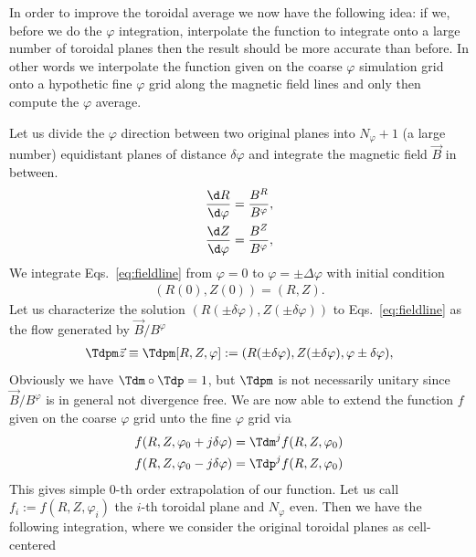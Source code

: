 In order to improve the toroidal average we now have the following idea:
if we, before we do the $\varphi$ integration,
interpolate the function to integrate onto a large number of toroidal
planes then the result should
be more accurate than before.
In other words we interpolate the function given on the coarse $\varphi$ simulation grid
onto a hypothetic fine $\varphi$ grid along the magnetic field lines
and only then compute the $\varphi$ average.

Let us divide the $\varphi$ direction between two original planes into $N_\varphi+1$ (a large number) equidistant planes
of distance $\delta \varphi$ and integrate the magnetic field $\vec B$ in between.
\begin{subequations}
\begin{align}
    \frac{\d R}{\d\varphi}&= \frac{B^R}{B^\varphi},\\ %
    \frac{\d Z}{\d\varphi}&=\frac{B^Z}{B^\varphi},\\%
\end{align}
\label{eq:fieldline}
\end{subequations}
We integrate Eqs.~\eqref{eq:fieldline} from $\varphi=0$ to $\varphi=\pm \Delta \varphi$
with initial condition
\begin{align}
    (R(0), Z(0) ) = (R, Z).
    \label{}
\end{align}
Let us characterize the solution $(R(\pm \delta \varphi), Z(\pm \delta \varphi))$ to Eqs.~\eqref{eq:fieldline} as the flow generated by $\vec B/B^\varphi$
\begin{align}
    \Tdpm\vec z \equiv \Tdpm[R, Z, \varphi]:= ( R(\pm \delta\varphi), Z( \pm \delta\varphi), \varphi\pm\delta \varphi),
    \label{}
\end{align}
Obviously we have $\Tdm\circ\Tdp = 1$, but $\Tdpm$ is not necessarily unitary since $\vec B/B^\varphi$ is in general
not divergence free.
We are now able to extend the function $f$ given on the coarse $\varphi$ grid unto the fine $\varphi$ grid via
\begin{align}
    f(R,Z,\varphi_0+j\delta\varphi) = {\Tdm}^j f(R,Z,\varphi_0)\\
    f(R,Z,\varphi_0-j\delta \varphi) = {\Tdp}^j f(R,Z,\varphi_0)
\end{align}
This gives simple 0-th order extrapolation of our function.
Let us call $f_i := f(R,Z,\varphi_i)$ the $i$-th toroidal plane and $N_\varphi$ even. Then
we have the following integration, where we consider the original toroidal planes as cell-centered
